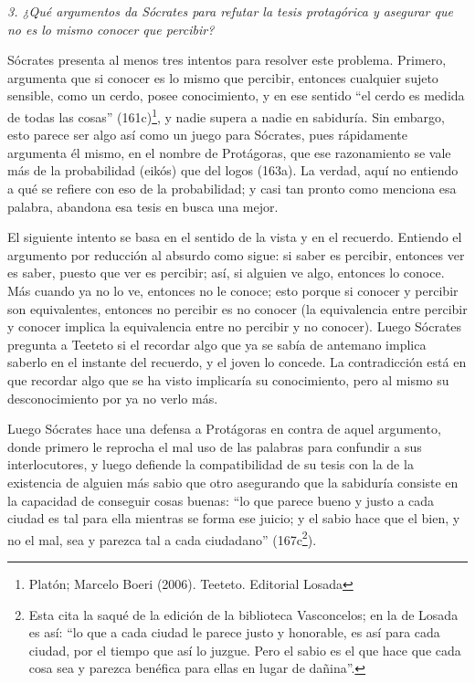 \medskip\noindent\emph{3. ¿Qué argumentos da
Sócrates para refutar la tesis protagórica y
asegurar que no es lo mismo conocer que
percibir?}

Sócrates presenta al menos tres intentos para
resolver este problema. Primero, argumenta
que si conocer es lo mismo que percibir,
entonces cualquier sujeto sensible, como un
cerdo, posee conocimiento, y en ese sentido
``el cerdo es medida de todas las cosas''
(161c)\footnote{Platón; Marcelo Boeri (2006).
Teeteto. Editorial Losada}, y nadie supera a
nadie en sabiduría. Sin embargo, esto parece
ser algo así como un juego para Sócrates,
pues rápidamente argumenta él mismo, en el
nombre de Protágoras, que ese razonamiento se
vale más de la probabilidad (eikós) que del
logos (163a). La verdad, aquí no entiendo a
qué se refiere con eso de la probabilidad; y
casi tan pronto como menciona esa palabra,
abandona esa tesis en busca una mejor.

El siguiente intento se basa en el sentido de
la vista y en el recuerdo. Entiendo el
argumento por reducción al absurdo como
sigue: si saber es percibir, entonces ver es
saber, puesto que ver es percibir; así, si
alguien ve algo, entonces lo conoce. Más
cuando ya no lo ve, entonces no le conoce;
esto porque si conocer y percibir son
equivalentes, entonces no percibir es no
conocer (la equivalencia entre percibir y
conocer implica la equivalencia entre no
percibir y no conocer). Luego Sócrates
pregunta a Teeteto si el recordar algo que ya
se sabía de antemano implica saberlo en el
instante del recuerdo, y el joven lo concede.
La contradicción está en que recordar algo
que se ha visto implicaría su conocimiento,
pero al mismo su desconocimiento por ya no
verlo más.

Luego Sócrates hace una defensa a Protágoras
en contra de aquel argumento, donde primero
le reprocha el mal uso de las palabras para
confundir a sus interlocutores, y luego
defiende la compatibilidad de su tesis con la
de la existencia de alguien más sabio que
otro asegurando que la sabiduría consiste en
la capacidad de conseguir cosas buenas: ``lo
que parece bueno y justo a cada ciudad es tal
para ella mientras se forma ese juicio; y el
sabio hace que el bien, y no el mal, sea y
parezca tal a cada ciudadano''
(167c\footnote{Esta cita la saqué de la
edición de la biblioteca Vasconcelos; en la
de Losada es así: ``lo que a cada ciudad le
parece justo y honorable, es así para cada
ciudad, por el tiempo que así lo juzgue. Pero
el sabio es el que hace que cada cosa sea y
parezca benéfica para ellas en lugar de
dañina''.}).

